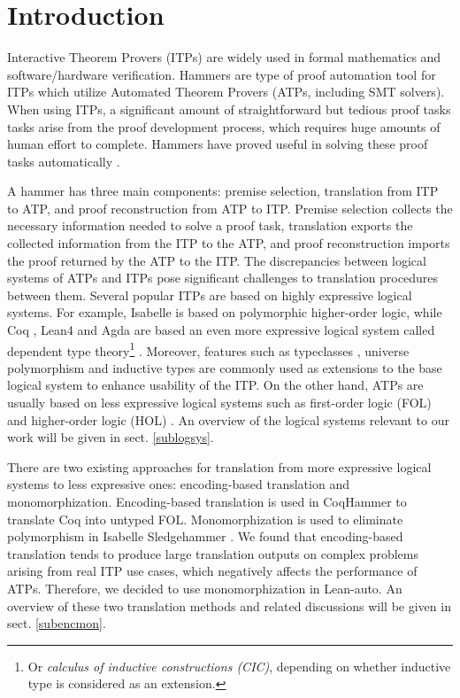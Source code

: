 \section{Introduction}

  Interactive Theorem Provers (ITPs) \cite{Harrison2014HistoryOI}
  are widely used in formal mathematics and software/hardware verification. Hammers
  \cite{Blanchette2016HammeringTQ}\cite{Czajka2018HammerFC} are type of proof automation tool for
  ITPs which utilize Automated Theorem Provers (ATPs, including SMT solvers).
  When using ITPs, a significant amount of straightforward but tedious proof tasks
  tasks arise from the proof development process, which requires huge amounts of human
  effort to complete. Hammers have proved useful in solving these proof tasks automatically \cite{Paulson2012ThreeYO}.
  
  A hammer has three main components: premise selection, translation from ITP to
  ATP, and proof reconstruction from ATP to ITP. Premise selection collects
  the necessary information needed to solve a proof task, translation exports
  the collected information from the ITP to the ATP, and proof reconstruction imports the
  proof returned by the ATP to the ITP. The discrepancies between logical systems of ATPs and ITPs pose
  significant challenges to translation procedures between them.
  Several popular ITPs are based on highly expressive logical systems.
  For example, Isabelle \cite{Isabelle} is based on polymorphic higher-order logic, while
  Coq \cite{CoqRefMan}, Lean4 \cite{Lean4} and Agda \cite{Agda}
  are based an even more expressive logical system called dependent type
  theory\footnote{Or \textit{calculus of inductive constructions (CIC)}, depending
  on whether inductive type is considered as an extension.}
  \cite{LambdaWithType}\cite{Coquand1988}.
  Moreover, features such as typeclasses \cite{TypeClassHaskell}, universe polymorphism \cite{UPolyCoq} and inductive types \cite{CICIndDef}
  are commonly used as extensions to the base logical system to enhance usability of the ITP.
  On the other hand, ATPs are usually based on less expressive logical systems such
  as first-order logic (FOL) \cite{CVC5}\cite{Vampire}\cite{Z3Paper}\cite{EProver} and
  higher-order logic (HOL) \cite{HOVampire}\cite{ZipperpositionMakeWork}\cite{HOEProver}.
  An overview of the logical systems relevant to our work will be given in sect. \ref{sublogsys}.
 
  There are two existing approaches for translation from more expressive
  logical systems to less expressive ones: encoding-based translation and monomorphization.
  Encoding-based translation is used in CoqHammer \cite{Czajka2018HammerFC}
  to translate Coq into untyped FOL. Monomorphization is used to
  eliminate polymorphism in Isabelle Sledgehammer \cite{Blanchette2016HammeringTQ}\cite{Paulson2012ThreeYO}.
  We found that encoding-based translation tends to produce large translation outputs
  on complex problems arising from real ITP use cases, which negatively affects the performance of ATPs.
  Therefore, we decided to use monomorphization in Lean-auto. An overview of these two
  translation methods and related discussions will be given in sect. \ref{subencmon}.

